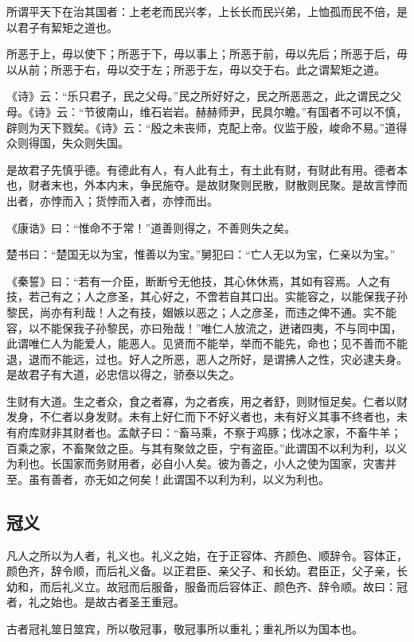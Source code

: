\documentclass[]{article}
\begin{document}
所谓平天下在治其国者：上老老而民兴孝，上长长而民兴弟，上恤孤而民不倍，是以君子有絜矩之道也。

所恶于上，毋以使下；所恶于下，毋以事上；所恶于前，毋以先后；所恶于后，毋以从前；所恶于右，毋以交于左；所恶于左，毋以交于右。此之谓絜矩之道。

《诗》云：``乐只君子，民之父母。''民之所好好之，民之所恶恶之，此之谓民之父母。《诗》云：``节彼南山，维石岩岩。赫赫师尹，民具尔瞻。''有国者不可以不慎，辟则为天下戮矣。《诗》云：``殷之未丧师，克配上帝。仪监于殷，峻命不易。''道得众则得国，失众则失国。

是故君子先慎乎德。有德此有人，有人此有土，有土此有财，有财此有用。德者本也，财者末也，外本内末，争民施夺。是故财聚则民散，财散则民聚。是故言悖而出者，亦悖而入；货悖而入者，亦悖而出。

《康诰》曰：``惟命不于常！''道善则得之，不善则失之矣。

楚书曰：``楚国无以为宝，惟善以为宝。''舅犯曰：``亡人无以为宝，仁亲以为宝。''

《秦誓》曰：``若有一介臣，断断兮无他技，其心休休焉，其如有容焉。人之有技，若己有之；人之彦圣，其心好之，不啻若自其口出。实能容之，以能保我子孙黎民，尚亦有利哉！人之有技，媢嫉以恶之；人之彦圣，而违之俾不通。实不能容，以不能保我子孙黎民，亦曰殆哉！''唯仁人放流之，迸诸四夷，不与同中国，此谓唯仁人为能爱人，能恶人。见贤而不能举，举而不能先，命也；见不善而不能退，退而不能远，过也。好人之所恶，恶人之所好，是谓拂人之性，灾必逮夫身。是故君子有大道，必忠信以得之，骄泰以失之。

生财有大道。生之者众，食之者寡，为之者疾，用之者舒，则财恒足矣。仁者以财发身，不仁者以身发财。未有上好仁而下不好义者也，未有好义其事不终者也，未有府库财非其财者也。孟献子曰：``畜马乘，不察于鸡豚；伐冰之家，不畜牛羊；百乘之家，不畜聚敛之臣。与其有聚敛之臣，宁有盗臣。''此谓国不以利为利，以义为利也。长国家而务财用者，必自小人矣。彼为善之，小人之使为国家，灾害并至。虽有善者，亦无如之何矣！此谓国不以利为利，以义为利也。

\hypertarget{header-n895}{%
\subsection{冠义}\label{header-n895}}

凡人之所以为人者，礼义也。礼义之始，在于正容体、齐颜色、顺辞令。容体正，颜色齐，辞令顺，而后礼义备。以正君臣、亲父子、和长幼。君臣正，父子亲，长幼和，而后礼义立。故冠而后服备，服备而后容体正、颜色齐、辞令顺。故曰：冠者，礼之始也。是故古者圣王重冠。

古者冠礼筮日筮宾，所以敬冠事，敬冠事所以重礼；重礼所以为国本也。
\end{document}
